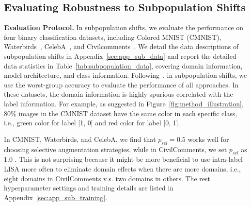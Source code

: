 \subsection{Evaluating Robustness to Subpopulation Shifts}
\label{sec:exp_main_sub}
\textbf{Evaluation Protocol.} In subpopulation shifts, we evaluate the performance on four binary classification datasets, including Colored MNIST (CMNIST), Waterbirds~\citep{sagawa2019distributionally}, CelebA~\citep{liu2015faceattributes}, and Civilcomments~\citep{borkan2019nuanced}. We detail the data descriptions of subpopulation shifts in Appendix~\ref{sec:app_sub_data} and report the detailed data statistics in Table~\ref{tab:subpopulation_data}, covering domain information, model architecture, and class information. Following~\citet{sagawa2019distributionally}, in subpopulation shifts, we use the worst-group accuracy to evaluate the performance of all approaches. In these datasets, the domain information is highly spurious correlated with the label information. For example, as suggested in Figure~\ref{fig:method_illustration}, 80\% images in the CMNIST dataset have the same color in each specific class, i.e., green color for label [1, 0] and red color for label [0, 1]. 

In CMNIST, Waterbirds, and CelebA, we find that $p_{sel}=0.5$ works well for choosing selective augmentation strategies, while in CivilComments, we set $p_{sel}$ as $1.0$ . This is not surprising because it might be more beneficial to use intra-label LISA more often to eliminate domain effects when there are more domains, i.e., eight domains in CivilComments v.s. two domains in others. The rest hyperparameter settings and training details are listed in Appendix~\ref{sec:app_sub_training}.


